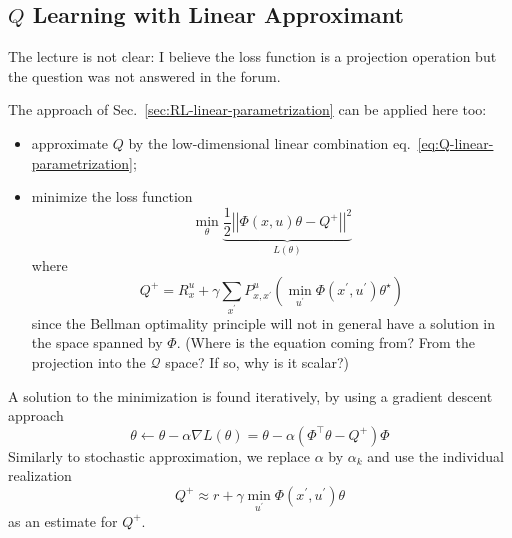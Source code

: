 \subsection{$Q$ Learning with Linear Approximant}

The lecture is not clear: I believe the loss function is a projection operation but the question was not answered in the forum.

The approach of Sec.~\ref{sec:RL-linear-parametrization} can be applied here too:
\begin{itemize}
\item approximate $Q$ by the low-dimensional linear combination eq.~\eqref{eq:Q-linear-parametrization};
\item minimize the loss function
  \begin{equation*}
    \min_\theta \underbrace{\frac{1}{2} \left|\!\left|\Phi(x,u)\theta - Q^+\right|\!\right|^2}_{L(\theta)}
  \end{equation*}
  where
  \begin{equation*}
    Q^+ = R_x^u + \gamma \sum_{x^\prime} P_{x,x^\prime}^u \left(\min_{u^\prime} \Phi(x^\prime,u^\prime)\theta^\star\right)
  \end{equation*}
  since the Bellman optimality principle will not in general have a solution in the space spanned by $\Phi$. (Where is the equation coming from? From the projection into the $\mathcal{Q}$ space? If so, why is it scalar?)
\end{itemize}
A solution to the minimization is found iteratively, by using a gradient descent approach
\begin{equation*}
  \theta \leftarrow \theta - \alpha \nabla L(\theta) = \theta - \alpha \left(\Phi^\top\theta - Q^+\right)\Phi
\end{equation*}
Similarly to stochastic approximation, we replace $\alpha$ by $\alpha_k$ and use the individual realization
\begin{equation*}
  Q^+\approx r + \gamma \min_{u^\prime} \Phi(x^\prime,u^\prime)\theta
\end{equation*}
as an estimate for $Q^+$.



